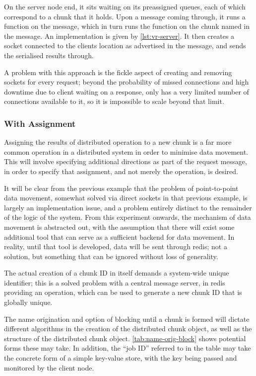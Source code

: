 On the server node end, it sits waiting on its preassigned queues, each of
which correspond to a chunk that it holds. 
Upon a message coming through, it runs a  function on the
message, which in turn runs the function on the chunk named in the message. 
An implementation is given by \cref{lst:vr-server}.
It then creates a socket connected to the clients location as advertised in
the message, and sends the serialised results through.

A problem with this approach is the fickle aspect of creating and removing
sockets for every request; beyond the probability of missed connections and
high downtime due to client waiting on a response, \R{} only has a very limited
number of connections available to it, so it is impossible to scale beyond that
limit.

\subsubsection{With Assignment}

Assigning the results of distributed operation to a new chunk is a far more
common operation in a distributed system in order to minimise data movement.
This will involve specifying additional directions as part of the request
message, in order to specify that assignment, and not merely the operation, is
desired.

It will be clear from the previous example that the problem of point-to-point
data movement, somewhat solved via direct sockets in that previous example, is
largely an implementation issue, and a problem entirely distinct to the
remainder of the logic of the system.
From this experiment onwards, the mechanism of data movement is abstracted out,
with the assumption that there will exist some additional tool that can serve
as a sufficient backend for data movement.
In reality, until that tool is developed, data will be sent through redis; not
a solution, but something that can be ignored without loss of generality.

The actual creation of a chunk ID in itself demands a system-wide unique
identifier; this is a solved problem with a central message server, in redis
providing an  operation, which can be used to generate a new chunk
ID that is globally unique.

The name origination and option of blocking until a chunk is formed will
dictate different algorithms in the creation of the distributed chunk object,
as well as the structure of the distributed chunk object.
\cref{tab:name-orig-block} shows potential forms these may take.
In addition, the ``job ID'' referred to in the table may
take the concrete form of a simple key-value store, with the key being passed
and monitored by the client node.

